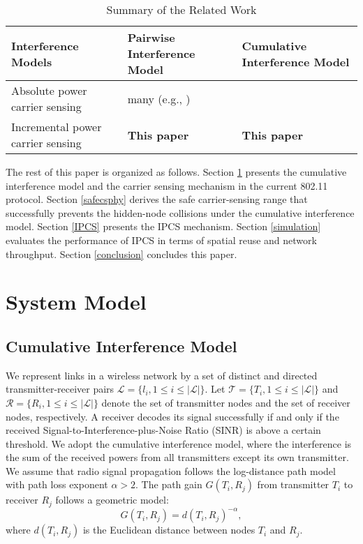 \documentclass[conference]{IEEEtran}
\begin{document}
\begin{table}[tb]
\caption{Summary of the Related Work}
\begin{center}
\renewcommand{\arraystretch}{1.3}
\footnotesize
\begin{tabular}{m{65pt}||m{68pt}|m{68pt}}
\hline \centering Interference Models & \centering Pairwise Interference
Model &\centering Cumulative Interference Model
\tabularnewline \hline\hline \centering Absolute power carrier sensing  & \centering many (e.g.,
\cite{LiBin,KXu})  &\centering \cite{TaeSuk,TingYu}
\tabularnewline \hline \centering Incremental power carrier sensing  &\centering
\textbf{This paper}&\centering \textbf{This paper}
\tabularnewline \hline
\end{tabular}
\end{center}
\label{Relatework}
\end{table}

The rest of this paper is organized as follows. Section \ref{system}
presents the cumulative interference model and the carrier sensing
mechanism in the current 802.11 protocol. Section \ref{safecsphy}
derives the safe carrier-sensing range that successfully prevents
the hidden-node collisions under the cumulative interference model.
Section \ref{IPCS} presents the IPCS mechanism. Section
\ref{simulation} evaluates the performance of IPCS in terms of
spatial reuse and network throughput. Section \ref{conclusion}
concludes this paper.



\section{System Model}\label{system}

\subsection{Cumulative Interference Model}\label{Model}

We represent links in a wireless network by a set of distinct and
directed transmitter-receiver pairs $\mathcal{L}=\{l_i, 1\le i \le
{\left| \mathcal{L} \right|}\}$. Let $\mathcal{T}=\{T_i, 1\le i \le
{\left| \mathcal{L} \right|}\}$ and $\mathcal{R}=\{R_i, 1\le i \le
{\left| \mathcal{L} \right|}\}$ denote the set of transmitter nodes
and the set of receiver nodes, respectively. A receiver decodes its
signal successfully if and only if the received
Signal-to-Interference-plus-Noise Ratio (SINR) is above a certain
threshold. We adopt the cumulative interference model, where the
interference is the sum of the received powers from all transmitters
except its own transmitter. We assume that radio signal propagation
follows the log-distance path model with path loss exponent
$\alpha>2$. The path gain $G(T_i,R_j)$ from transmitter $T_i$ to
receiver $R_j$ follows a geometric model:
\begin{equation}
G(T_i,R_j)={d(T_i,R_j)}^{-\alpha}, \label{channelm}\nonumber
\end{equation}
where $d(T_i,R_j)$ is the Euclidean distance between nodes $T_i$ and
$R_j$.
\end{document}
